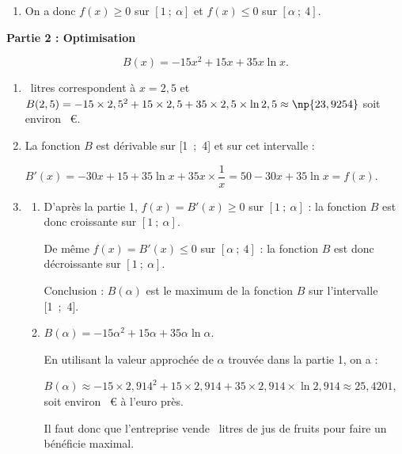 \begin{enumerate}
Sur l'intervalle $\left[\dfrac{7}{6}~;~4\right]$, $f$ est continue et strictement décroissante.

Comme $0 \in \left[f\left(\frac{7}{6}\right)~;~f(4)\right]$, il existe d'après le théorème des valeurs intermédiaires, un réel unique $\alpha$ de cet intervalle tel que $f(\alpha) = 0$.

$\bullet~~$On a $f(2) \approx 14,26$ et $f(3)\approx -1,54$, donc $2 < \alpha < 3$ ;

$\bullet~~$On a $f(2,9) \approx 0,26$ et $f(3,0)\approx -1,54$, donc $2,9 < \alpha < 3,0$ ;

$\bullet~~$On a $f(2,91) \approx 0,09$ et $f(2,92)\approx -0,09$, donc $2,91 < \alpha < 2,92$ ;

$\bullet~~$On a $f(2,914) \approx 0,0013$ et $f(2,915)\approx -0,005$, donc $2,914 < \alpha < 2,915$.
\item  
On a donc $f(x) \geqslant 0$ sur $[1~;~\alpha]$ et $f(x) \leqslant 0$ sur $[\alpha~;~4]$.
\end{enumerate}

\bigskip

\textbf{Partie 2 : Optimisation}

\medskip



\[B(x) = - 15x^2 + 15x +35x \ln x.\]

\begin{enumerate}
\item 


~litres correspondent à $x = 2,5$ et $B(2,5) = - 15 \times 2,5^2 + 15 \times 2,5 + 35 \times 2,5 \times \ln 2,5 \approx \np{23,9254}$ soit environ ~\euro.
\item 
La fonction $B$ est dérivable sur [1~;~4] et sur cet intervalle :

$B'(x) = - 30x + 15 + 35\ln x + 35x \times \dfrac{1}{x} = 50 - 30x + 35\ln x = f(x)$.
\item 
	\begin{enumerate}
		\item 
D'après la partie 1, $f(x) = B'(x) \geqslant  0$ sur $[1~;~\alpha]$ : la fonction $B$ est donc croissante sur $[1~;~\alpha]$.

De même $f(x) = B'(x) \leqslant  0$ sur $[\alpha~;~4]$ : la fonction $B$ est donc décroissante sur $[1~;~\alpha]$.

Conclusion : $B(\alpha)$ est le maximum de la fonction $B$ sur l'intervalle [1~;~4].
		\item 
$B(\alpha) = - 15\alpha^2 + 15\alpha + 35\alpha \ln \alpha$.

En utilisant la valeur approchée de $\alpha$ trouvée dans la partie 1, on a :

$B(\alpha) \approx - 15 \times 2,914^2 + 15 \times 2,914 + 35 \times 2,914 \times \ln 2,914 \approx 25,4201$, soit environ ~\euro{} à l'euro près.

Il faut donc que l'entreprise vende ~litres de jus de fruits pour faire un bénéficie maximal.
	\end{enumerate}
\end{enumerate}
